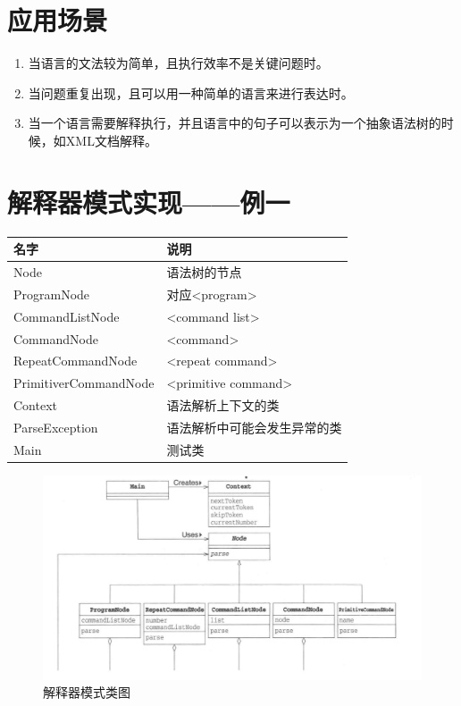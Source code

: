 \section{应用场景}
\begin{enumerate}
	\item 当语言的文法较为简单，且执行效率不是关键问题时。
	\item 当问题重复出现，且可以用一种简单的语言来进行表达时。
	\item 当一个语言需要解释执行，并且语言中的句子可以表示为一个抽象语法树的时候，如XML文档解释。
\end{enumerate}
\section{解释器模式实现——例一}
\begin{table}[!h]
	\begin{tabular}{|l|l|}
		\hline
		名字&说明\\
		\hline
		Node&语法树的节点\\
		\hline
		ProgramNode&对应<program>\\
		\hline
		CommandListNode&<command list>\\
		\hline
		CommandNode&<command>\\
		\hline
		RepeatCommandNode&<repeat command>\\
		\hline
		PrimitiverCommandNode&<primitive command>\\
		\hline
		Context&语法解析上下文的类\\
		\hline
		ParseException&语法解析中可能会发生异常的类\\
		\hline
		Main&测试类\\
		\hline
	\end{tabular}
\end{table}
\begin{figure}[!h]
	\centering
	\includegraphics[width=\textwidth]{image/23-1}
	\caption{解释器模式类图}
\end{figure}
